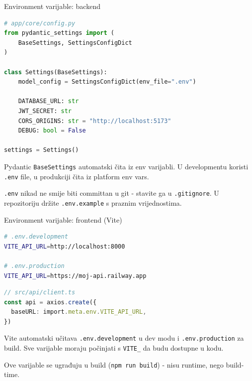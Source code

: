 \begin{frame}[fragile,shrink=5]{Environment varijable: backend}
\begin{lstlisting}[language=python]
# app/core/config.py
from pydantic_settings import (
    BaseSettings, SettingsConfigDict
)

class Settings(BaseSettings):
    model_config = SettingsConfigDict(env_file=".env")

    DATABASE_URL: str
    JWT_SECRET: str
    CORS_ORIGINS: str = "http://localhost:5173"
    DEBUG: bool = False

settings = Settings()
\end{lstlisting}

\vspace{0.4em}
Pydantic \texttt{BaseSettings} automatski čita iz env varijabli. U developmentu koristi \texttt{.env} file, u produkciji čita iz platform env vars.

\vspace{0.4em}
\texttt{.env} nikad ne smije biti committan u git - stavite ga u \texttt{.gitignore}. U repozitoriju držite \texttt{.env.example} s praznim vrijednostima.
\end{frame}

\begin{frame}[fragile,shrink=5]{Environment varijable: frontend (Vite)}
\begin{lstlisting}[language=bash]
# .env.development
VITE_API_URL=http://localhost:8000

# .env.production
VITE_API_URL=https://moj-api.railway.app
\end{lstlisting}

\begin{lstlisting}[language=typescript]
// src/api/client.ts
const api = axios.create({
  baseURL: import.meta.env.VITE_API_URL,
})
\end{lstlisting}

\vspace{0.4em}
Vite automatski učitava \texttt{.env.development} u dev modu i \texttt{.env.production} za build. Sve varijable moraju počinjati s \texttt{VITE\_} da budu dostupne u kodu.

\vspace{0.4em}
Ove varijable se ugrađuju u build (\texttt{npm run build}) - nisu runtime, nego build-time.
\end{frame}

